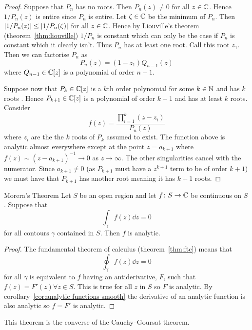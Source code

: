 \documentclass{article}
\begin{document}
    \begin{proof}
        Suppose that \(P_n\) has no roots.
        Then \(P_n(z)\ne 0\) for all \(z\in\mathbb{C}\).
        Hence \(1/P_n(z)\) is entire since \(P_n\) is entire.
        Let \(\zeta\in\mathbb{C}\) be the minimum of \(P_n\).
        Then \(\abs{1/P_n(z)} \le \abs{1/P_n(\zeta)}\) for all \(z\in\mathbb{C}\).
        Hence by Liouville's theorem (theorem~\ref{thm:liouville}) \(1/P_n\) is constant which can only be the case if \(P_n\) is constant which it clearly isn't.
        Thus \(P_n\) has at least one root.
        Call this root \(z_1\).
        Then we can factorise \(P_n\) as
        \[P_n(z) = (1 - z_1)Q_{n-1}(z)\]
        where \(Q_{n-1}\in\mathbb{C}[z]\) is a polynomial of order \(n-1\).
        
        Suppose now that \(P_{k}\in\mathbb{C}[z]\) is a \(k\)th order polynomial for some \(k\in\mathbb{N}\) and has \(k\) roots .
        Hence \(P_{k+1}\in\mathbb{C}[z]\) is a polynomial of order \(k+1\) and has at least \(k\) roots.
        Consider
        \[f(z) = \frac{\prod_{i=1}^{k}(z - z_i)}{P_n(z)}\]
        where \(z_i\) are the the \(k\) roots of \(P_k\) assumed to exist.
        The function above is analytic almost everywhere except at the point \(z = a_{k+1}\) where \(f(z) \sim (z - a_{k+1})^{-1} \to 0\) as \(z \to \infty\).
        The other singularities cancel with the numerator.
        Since \(a_{k+1}\ne 0\) (as \(P_{k+1}\) must have a \(z^{k+1}\) term to be of order \(k + 1\)) we must have that \(P_{k+1}\) has another root meaning it has \(k + 1\) roots.
    \end{proof}
    
    \begin{theorem}{Morera's Theorem}{}
        Let \(S\) be an open region and let \(f\colon S\to\mathbb{C}\) be continuous on \(S\).
        Suppose that
        \[\int_\gamma f(z) \dd{z} = 0\]
        for all contours \(\gamma\) contained in \(S\).
        Then \(f\) is analytic.
    \end{theorem}
    \begin{proof}
        The fundamental theorem of calculus (theorem~\ref{thm:ftc}) means that
        \[\oint_\gamma f(z)\dd{z} = 0\]
        for all \(\gamma\) is equivalent to \(f\) having an antiderivative, \(F\), such that \(f(z) = F'(z)\forall z\in S\).
        This is true for all \(z\) in \(S\) so \(F\) is analytic.
        By corollary~\ref{cor:analytic functions smooth} the derivative of an analytic function is also analytic so \(f = F'\) is analytic.
    \end{proof}
    This theorem is the converse of the Cauchy--Goursat theorem.
    
\end{document}
